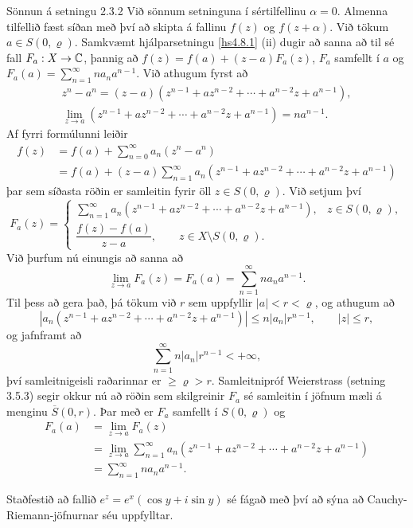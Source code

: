 \begin{sotx}{Sönnun á setningu 2.3.2}   
  Við sönnum setninguna í sértilfellinu $\alpha=0$.
Almenna tilfellið fæst síðan með því að skipta á fallinu $f(z)$ og
$f(z+\alpha)$.    Við tökum $a\in S(0,\varrho)$.
Samkvæmt hjálparsetningu \ref{hs4.8.1} (ii) dugir að sanna að
til sé fall $F_a:X\to {\mathbb C}$, þannig að  $f(z)=f(a)+(z-a)F_a(z)$, 
 $F_a$ samfellt í $a$ og $F_a(a)=\sum_{n=1}^\infty na_na^{n-1}$.  Við
athugum fyrst að 
\begin{gather*}
z^n-a^n=(z-a)(z^{n-1}+az^{n-2}+\cdots+a^{n-2}z+a^{n-1}),\\
 \lim_{z\to a}(z^{n-1}+az^{n-2}+\cdots+a^{n-2}z+a^{n-1}) = na^{n-1}.
\end{gather*}
Af fyrri formúlunni leiðir
\begin{align*}
f(z)&=f(a)+\sum_{n=0}^\infty a_n(z^n-a^n)\\
&=f(a)+(z-a)\sum_{n=1}^\infty 
a_n (z^{n-1}+az^{n-2}+\cdots+a^{n-2}z+a^{n-1})
\end{align*}
þar sem síðasta röðin er samleitin fyrir öll $z\in S(0,\varrho)$.
Við setjum því 
 $$F_a(z)=\begin{cases}    
\sum_{n=1}^\infty a_n
(z^{n-1}+az^{n-2}+\cdots+a^{n-2}z+a^{n-1}),
&z\in S(0,\varrho),\\
\dfrac{f(z)-f(a)}{z-a}, \qquad z\in X\setminus S(0,\varrho).
\end{cases}
 $$
Við þurfum nú einungis að sanna að 
 $$\lim_{z\to a} F_a(z)=F_a(a)=\sum_{n=1}^\infty na_na^{n-1}.
 $$
Til þess að gera það, þá tökum við $r$ sem uppfyllir $|a|<r<\varrho$,
og athugum að 
 $$
|a_n(z^{n-1}+az^{n-2}+\cdots+a^{n-2}z+a^{n-1})|\leq n|a_n|r^{n-1},
\qquad |z|\leq r,
 $$
og jafnframt að  
 $$\sum_{n=1}^\infty n|a_n|r^{n-1}<+\infty,
 $$
því samleitnigeisli raðarinnar er $\geq \varrho>r$.
Samleitnipróf Weierstrass (setning 3.5.3) 
segir okkur nú að röðin sem skilgreinir 
$F_a$ sé samleitin í jöfnum mæli á menginu $\overline S(0,r)$. 
Þar með er $F_a$ samfellt í $S(0,\varrho)$ og 
\begin{align*}
F_a(a)&=\lim_{z\to a} F_a(z)\\
&=  \lim_{z\to a}
\sum_{n=1}^\infty a_n (z^{n-1}+az^{n-2}+\cdots+a^{n-2}z+a^{n-1})\\
&=\sum_{n=1}^\infty na_na^{n-1}.
\end{align*}
\end{sotx}


\vfill\eject


\aefing

\daemi  Staðfestið að fallið $e^z=e^x(\cos y+i\sin y)$ sé fágað með því
að sýna að Cauchy-Riemann-jöfnurnar séu uppfylltar.

